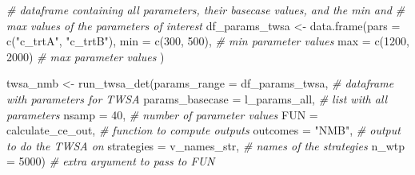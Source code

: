\documentclass[
]{article}
\newenvironment{Shaded}{\begin{snugshade}}{\end{snugshade}}
\newcommand{\AttributeTok}[1]{\textcolor[rgb]{0.77,0.63,0.00}{#1}}
\newcommand{\CommentTok}[1]{\textcolor[rgb]{0.56,0.35,0.01}{\textit{#1}}}
\newcommand{\DecValTok}[1]{\textcolor[rgb]{0.00,0.00,0.81}{#1}}
\newcommand{\FunctionTok}[1]{\textcolor[rgb]{0.00,0.00,0.00}{#1}}
\newcommand{\NormalTok}[1]{#1}
\newcommand{\OtherTok}[1]{\textcolor[rgb]{0.56,0.35,0.01}{#1}}
\newcommand{\StringTok}[1]{\textcolor[rgb]{0.31,0.60,0.02}{#1}}
\begin{document}
\begin{Shaded}
\begin{Highlighting}[]
\CommentTok{\# dataframe containing all parameters, their basecase values, and the min and }
\CommentTok{\# max values of the parameters of interest}
\NormalTok{df\_params\_twsa }\OtherTok{\textless{}{-}} \FunctionTok{data.frame}\NormalTok{(}\AttributeTok{pars =} \FunctionTok{c}\NormalTok{(}\StringTok{"c\_trtA"}\NormalTok{, }\StringTok{"c\_trtB"}\NormalTok{),}
                             \AttributeTok{min  =} \FunctionTok{c}\NormalTok{(}\DecValTok{300}\NormalTok{, }\DecValTok{500}\NormalTok{),  }\CommentTok{\# min parameter values}
                             \AttributeTok{max  =} \FunctionTok{c}\NormalTok{(}\DecValTok{1200}\NormalTok{, }\DecValTok{2000}\NormalTok{) }\CommentTok{\# max parameter values}
\NormalTok{)}

\NormalTok{twsa\_nmb }\OtherTok{\textless{}{-}} \FunctionTok{run\_twsa\_det}\NormalTok{(}\AttributeTok{params\_range    =}\NormalTok{ df\_params\_twsa,    }\CommentTok{\# dataframe with parameters for TWSA}
                         \AttributeTok{params\_basecase =}\NormalTok{ l\_params\_all,      }\CommentTok{\# list with all parameters}
                         \AttributeTok{nsamp           =} \DecValTok{40}\NormalTok{,                }\CommentTok{\# number of parameter values}
                         \AttributeTok{FUN             =}\NormalTok{ calculate\_ce\_out,  }\CommentTok{\# function to compute outputs}
                         \AttributeTok{outcomes        =} \StringTok{"NMB"}\NormalTok{,             }\CommentTok{\# output to do the TWSA on}
                         \AttributeTok{strategies      =}\NormalTok{ v\_names\_str,       }\CommentTok{\# names of the strategies}
                         \AttributeTok{n\_wtp           =} \DecValTok{5000}\NormalTok{)              }\CommentTok{\# extra argument to pass to FUN}
\end{Highlighting}
\end{Shaded}
\end{document}
